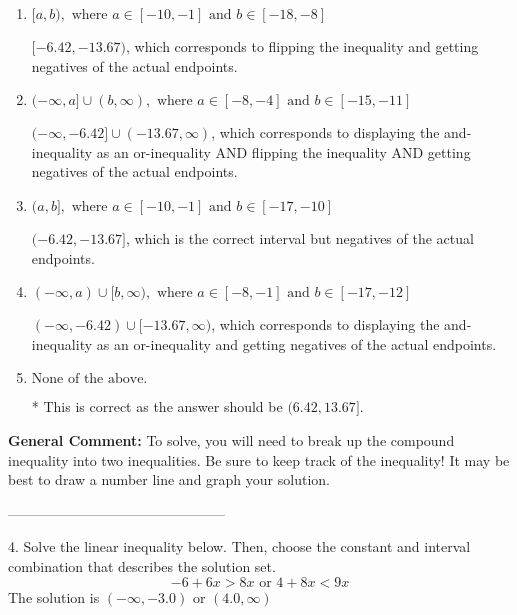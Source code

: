 \documentclass{extbook}[14pt]
\begin{document}
\begin{enumerate}[label=\Alph*.] 
\item $ [a, b), \text{ where } a \in [-10, -1] \text{ and } b \in [-18, -8] $ 

 $[-6.42, -13.67)$, which corresponds to flipping the inequality and getting negatives of the actual endpoints. 
\item $ (-\infty, a] \cup (b, \infty), \text{ where } a \in [-8, -4] \text{ and } b \in [-15, -11] $ 

 $(-\infty, -6.42] \cup (-13.67, \infty)$, which corresponds to displaying the and-inequality as an or-inequality AND flipping the inequality AND getting negatives of the actual endpoints. 
\item $ (a, b], \text{ where } a \in [-10, -1] \text{ and } b \in [-17, -10] $ 

 $(-6.42, -13.67]$, which is the correct interval but negatives of the actual endpoints. 
\item $ (-\infty, a) \cup [b, \infty), \text{ where } a \in [-8, -1] \text{ and } b \in [-17, -12] $ 

 $(-\infty, -6.42) \cup [-13.67, \infty)$, which corresponds to displaying the and-inequality as an or-inequality and getting negatives of the actual endpoints. 
\item $ \text{None of the above.} $ 

 * This is correct as the answer should be $(6.42, 13.67]$. 
\end{enumerate} 
 
\textbf{General Comment:} To solve, you will need to break up the compound inequality into two inequalities. Be sure to keep track of the inequality! It may be best to draw a number line and graph your solution. 

-----------------------------------------------

4. Solve the linear inequality below. Then, choose the constant and interval combination that describes the solution set.
\[ -6 + 6 x > 8 x \text{ or } 4 + 8 x < 9 x \] 
The solution is $ (-\infty, -3.0) \text{ or } (4.0, \infty) $ 
\end{document}
